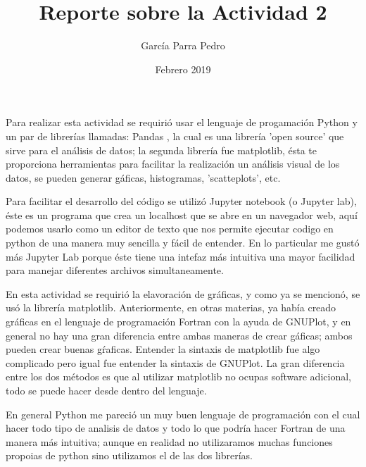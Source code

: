 \documentclass[12pt]{article}
\title{Reporte sobre la Actividad 2}
\author{García Parra Pedro}
\date{Febrero 2019}
\begin{document}
\maketitle

Para realizar esta actividad se requirió usar el lenguaje de progamación Python y un par de librerías llamadas: Pandas \cite{Pandas}, la cual es una librería 'open source' que sirve para el análisis de datos; la segunda librería fue matplotlib\cite{matplotlib}, ésta te proporciona herramientas para facilitar la realización un análisis visual de los datos, se pueden generar gáficas, histogramas, 'scatteplots', etc.

Para facilitar el desarrollo del código se utilizó Jupyter notebook (o Jupyter lab), éste es un programa que crea un localhost que se abre en un navegador web, aquí podemos usarlo como un editor de texto que nos permite ejecutar codigo en python de una manera muy sencilla y fácil de entender. En lo particular me gustó más Jupyter Lab porque éste tiene una intefaz más intuitiva una mayor facilidad para manejar diferentes archivos simultaneamente.

En esta actividad se requirió la elavoración de gráficas, y como ya se mencionó, se usó la librería matplotlib. Anteriormente, en otras materias, ya había creado gráficas en el lenguaje de programación Fortran con la ayuda de GNUPlot, y en general no hay una gran diferencia entre ambas maneras de crear gáficas; ambos pueden crear buenas gŕaficas. Entender la sintaxis de matplotlib fue algo complicado pero igual fue entender la sintaxis de GNUPlot. La gran diferencia entre los dos métodos es que al utilizar matplotlib no ocupas software adicional, todo se puede hacer desde dentro del lenguaje.

En general Python me pareció un muy buen lenguaje de programación con el cual hacer todo tipo de analisis de datos y todo lo que podría hacer Fortran de una manera más intuitiva; aunque en realidad no utilizaramos muchas funciones propoias de python sino utilizamos el de las dos librerías.



\end{document}
